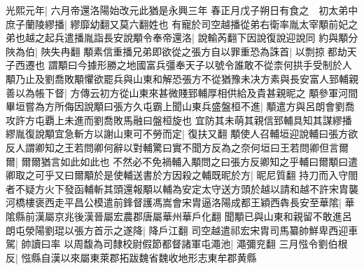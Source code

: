 光熙元年|{
	六月帝還洛陽始改元此猶是永興三年}
春正月戊子朔日有食之　初太弟中庶子蘭陵繆播|{
	繆靡幼翻又莫六翻姓也}
有寵於司空越播從弟右衛率胤太宰顒前妃之弟也越之起兵遣播胤詣長安說顒令奉帝還洛|{
	說輸芮翻下因說復說迎說同}
約與顒分陜為伯|{
	陜失冉翻}
顒素信重播兄弟即欲從之張方自以罪重恐為誅首|{
	以剽掠都劫天子西遷也}
謂顒曰今據形勝之地國富兵彊奉天子以號令誰敢不從柰何拱手受制於人顒乃止及劉喬敗顒懼欲罷兵與山東和解恐張方不從猶豫未决方素與長安富人郅輔親善以為帳下督|{
	方傳云初方從山東來甚微賤郅輔厚相供給及貴甚親昵之}
顒參軍河間畢垣嘗為方所侮因說顒曰張方久屯霸上聞山東兵盛盤桓不進|{
	顒遣方與呂朗會劉喬攻許方屯覇上未進而劉喬敗馬融曰盤桓旋也}
宜防其未萌其親信郅輔具知其謀繆播繆胤復說顒宜急斬方以謝山東可不勞而定|{
	復扶又翻}
顒使人召輔垣迎說輔曰張方欲反人謂卿知之王若問卿何辭以對輔驚曰實不聞方反為之奈何垣曰王若問卿但言爾爾|{
	爾爾猶言如此如此也}
不然必不免禍輔入顒問之曰張方反卿知之乎輔曰爾顒曰遣卿取之可乎又曰爾顒於是使輔送書於方因殺之輔既昵於方|{
	昵尼質翻}
持刀而入守閤者不疑方火下發函輔斬其頭還報顒以輔為安定太守送方頭於越以請和越不許宋胄襲河橋樓褒西走平昌公模遣前鋒督護馮嵩會宋胄逼洛陽成都王穎西犇長安至華隂|{
	華隂縣前漢屬京兆後漢晉屬宏農郡唐屬華州華戶化翻}
聞顒已與山東和親留不敢進呂朗屯滎陽劉琨以張方首示之遂降|{
	降戶江翻}
司空越遣祁宏宋胄司馬纂帥鮮卑西迎車駕|{
	帥讀曰率}
以周馥為司隸校尉假節都督諸軍屯澠池|{
	澠彌兖翻}
三月惤令劉伯根反|{
	惤縣自漢以來屬東萊郡拓跋魏省魏收地形志東牟郡黄縣}


